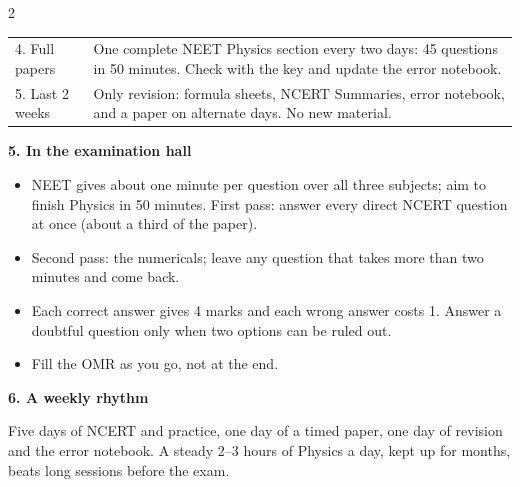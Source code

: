 \begin{multicols}{2}
{\begin{tabularx}{\linewidth}{@{}l>{\raggedright\arraybackslash}X@{}}
4. Full papers & One complete NEET Physics section every two days: 45 questions in 50 minutes. Check with the key and update the error notebook.\\
5. Last 2 weeks & Only revision: formula sheets, NCERT Summaries, error notebook, and a paper on alternate days. No new material.\\
\bottomrule\end{tabularx}}\par\medskip
\textbf{\color{crimson}5. In the examination hall}\par\smallskip
\begin{itemize}[leftmargin=1.1em,itemsep=2pt,topsep=0pt]
\item NEET gives about one minute per question over all three subjects; aim to finish Physics in 50 minutes. First pass: answer every direct NCERT question at once (about a third of the paper).
\item Second pass: the numericals; leave any question that takes more than two minutes and come back.
\item Each correct answer gives 4 marks and each wrong answer costs 1. Answer a doubtful question only when two options can be ruled out.
\item Fill the OMR as you go, not at the end.
\end{itemize}\medskip
\textbf{\color{crimson}6. A weekly rhythm}\par\smallskip
{\small Five days of NCERT and practice, one day of a timed paper, one day of revision and the error notebook. A steady 2--3 hours of Physics a day, kept up for months, beats long sessions before the exam.}\par
\end{multicols}
